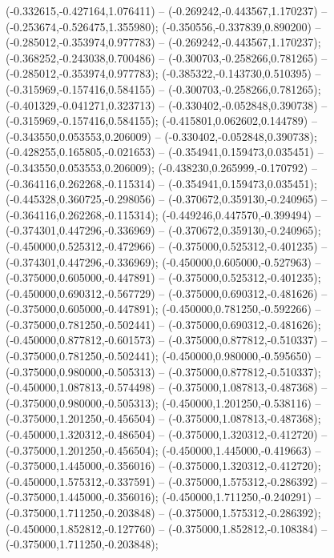  (-0.332615,-0.427164,1.076411) -- (-0.269242,-0.443567,1.170237) -- (-0.253674,-0.526475,1.355980);
 (-0.350556,-0.337839,0.890200) -- (-0.285012,-0.353974,0.977783) -- (-0.269242,-0.443567,1.170237);
 (-0.368252,-0.243038,0.700486) -- (-0.300703,-0.258266,0.781265) -- (-0.285012,-0.353974,0.977783);
 (-0.385322,-0.143730,0.510395) -- (-0.315969,-0.157416,0.584155) -- (-0.300703,-0.258266,0.781265);
 (-0.401329,-0.041271,0.323713) -- (-0.330402,-0.052848,0.390738) -- (-0.315969,-0.157416,0.584155);
 (-0.415801,0.062602,0.144789) -- (-0.343550,0.053553,0.206009) -- (-0.330402,-0.052848,0.390738);
 (-0.428255,0.165805,-0.021653) -- (-0.354941,0.159473,0.035451) -- (-0.343550,0.053553,0.206009);
 (-0.438230,0.265999,-0.170792) -- (-0.364116,0.262268,-0.115314) -- (-0.354941,0.159473,0.035451);
 (-0.445328,0.360725,-0.298056) -- (-0.370672,0.359130,-0.240965) -- (-0.364116,0.262268,-0.115314);
 (-0.449246,0.447570,-0.399494) -- (-0.374301,0.447296,-0.336969) -- (-0.370672,0.359130,-0.240965);
 (-0.450000,0.525312,-0.472966) -- (-0.375000,0.525312,-0.401235) -- (-0.374301,0.447296,-0.336969);
 (-0.450000,0.605000,-0.527963) -- (-0.375000,0.605000,-0.447891) -- (-0.375000,0.525312,-0.401235);
 (-0.450000,0.690312,-0.567729) -- (-0.375000,0.690312,-0.481626) -- (-0.375000,0.605000,-0.447891);
 (-0.450000,0.781250,-0.592266) -- (-0.375000,0.781250,-0.502441) -- (-0.375000,0.690312,-0.481626);
 (-0.450000,0.877812,-0.601573) -- (-0.375000,0.877812,-0.510337) -- (-0.375000,0.781250,-0.502441);
 (-0.450000,0.980000,-0.595650) -- (-0.375000,0.980000,-0.505313) -- (-0.375000,0.877812,-0.510337);
 (-0.450000,1.087813,-0.574498) -- (-0.375000,1.087813,-0.487368) -- (-0.375000,0.980000,-0.505313);
 (-0.450000,1.201250,-0.538116) -- (-0.375000,1.201250,-0.456504) -- (-0.375000,1.087813,-0.487368);
 (-0.450000,1.320312,-0.486504) -- (-0.375000,1.320312,-0.412720) -- (-0.375000,1.201250,-0.456504);
 (-0.450000,1.445000,-0.419663) -- (-0.375000,1.445000,-0.356016) -- (-0.375000,1.320312,-0.412720);
 (-0.450000,1.575312,-0.337591) -- (-0.375000,1.575312,-0.286392) -- (-0.375000,1.445000,-0.356016);
 (-0.450000,1.711250,-0.240291) -- (-0.375000,1.711250,-0.203848) -- (-0.375000,1.575312,-0.286392);
 (-0.450000,1.852812,-0.127760) -- (-0.375000,1.852812,-0.108384) -- (-0.375000,1.711250,-0.203848);
